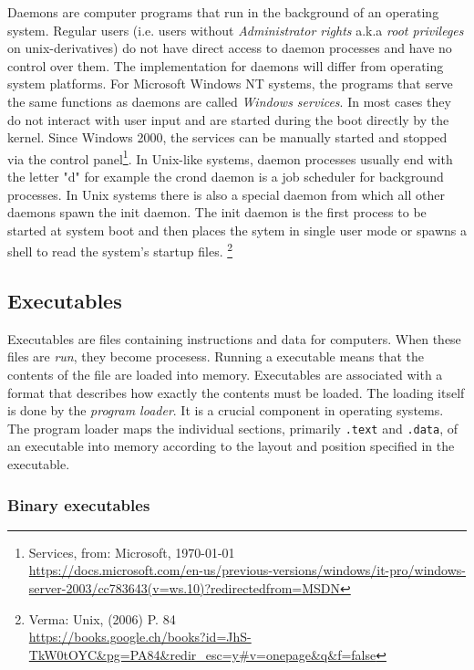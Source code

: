 Daemons are computer programs that run in the background of an operating system. Regular users (i.e. users without \textit{Administrator rights} a.k.a \textit{root privileges} on unix-derivatives)
do not have direct access to daemon processes and have no control over them. The implementation for daemons will differ from
operating system platforms. For Microsoft Windows NT systems, the programs that serve the same functions as 
daemons are called \textit{Windows services}. In most cases they do not interact with user input and are started 
during the boot directly by the kernel. Since Windows 2000, the services can be manually started and stopped via the control panel\footnote{Services, from: Microsoft, \today \\ \url{https://docs.microsoft.com/en-us/previous-versions/windows/it-pro/windows-server-2003/cc783643(v=ws.10)?redirectedfrom=MSDN}}.
In Unix-like systems, daemon processes usually end with the letter "d" for example the crond daemon is 
a job scheduler for background processes. In Unix systems there is also a special daemon from which all
other daemons spawn the init daemon. The init daemon is the first process to be started at system boot 
and then places the sytem in single user mode or spawns a shell to read the system's startup files. \footnote{Verma: Unix, (2006) P. 84 \\ \url{https://books.google.ch/books?id=JhS-TkW0tOYC&pg=PA84&redir_esc=y#v=onepage&q&f=false}}



\subsection{Executables}

Executables are files containing instructions and data for computers. When these files are \textit{run}, they
become procesess. Running a executable means that the contents of the file are loaded into memory. Executables
are associated with a format that describes how exactly the contents must be loaded. The loading itself
is done by the \textit{program loader}. It is a crucial component in operating systems. The program loader
maps the individual sections, primarily \texttt{.text} and \texttt{.data}, of an executable into memory according to the layout and position
specified in the executable. 

\subsubsection{Binary executables}




